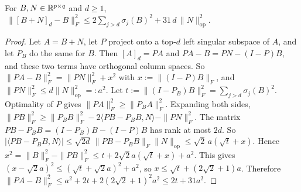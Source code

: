 \begin{lemma}[Truncation]\label{lem:trunc}
\Pv\Ck For $B,N\in\mathbb{R}^{p\times q}$ and $d\ge1$, $\ \|[B+N]_d-B\|_F^2\le2\sum_{j>d}\sigma_j(B)^2+31\,d\,\|N\|_{\mathrm{op}}^2$.
\end{lemma}
\begin{proof}
Let $A=B+N$, let $P$ project onto a top-$d$ left singular subspace of $A$, and let $P_B$ do the same for $B$. Then
$[A]_d=PA$ and $PA-B=PN-(I-P)B$, and these two terms have orthogonal column spaces. So
$\|PA-B\|_F^2=\|PN\|_F^2+x^2$ with $x:=\|(I-P)B\|_F$, and $\|PN\|_F^2\le d\|N\|_{\mathrm{op}}^2=:a^2$. Let $t:=\|(I-P_B)B\|_F^2=\sum_{j>d}\sigma_j(B)^2$.
Optimality of $P$ gives $\|PA\|_F^2\ge\|P_BA\|_F^2$. Expanding both sides,
$\|PB\|_F^2\ge\|P_BB\|_F^2-2\langle PB-P_BB,N\rangle-\|PN\|_F^2$. The matrix $PB-P_BB=(I-P_B)B-(I-P)B$ has rank at most $2d$.
So $|\langle PB-P_BB,N\rangle|\le\sqrt{2d}\,\|PB-P_BB\|_F\|N\|_{\mathrm{op}}\le\sqrt2\,a(\sqrt t+x)$. Hence
$x^2=\|B\|_F^2-\|PB\|_F^2\le t+2\sqrt2a(\sqrt t+x)+a^2$. This gives
$(x-\sqrt2a)^2\le(\sqrt t+\sqrt2a)^2+a^2$, so $x\le\sqrt t+(2\sqrt2+1)a$. Therefore
$\|PA-B\|_F^2\le a^2+2t+2(2\sqrt2+1)^2a^2\le2t+31a^2$.
\end{proof}

